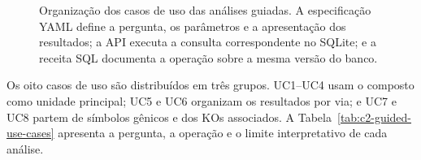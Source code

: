 \begin{figure}[htbp]
\centering
{}
\caption{Organização dos casos de uso das análises guiadas. A especificação
YAML define a pergunta, os parâmetros e a apresentação dos resultados; a API
executa a consulta correspondente no SQLite; e a receita SQL documenta a
operação sobre a mesma versão do banco. }
\label{fig:c2-guided-structure}
\end{figure}

Os oito casos de uso são distribuídos em três grupos. UC1--UC4 usam o composto
como unidade principal; UC5 e UC6 organizam os resultados por via; e UC7 e UC8
partem de símbolos gênicos e dos KOs associados. A
Tabela~\ref{tab:c2-guided-use-cases} apresenta a pergunta, a operação e o
limite interpretativo de cada análise.

